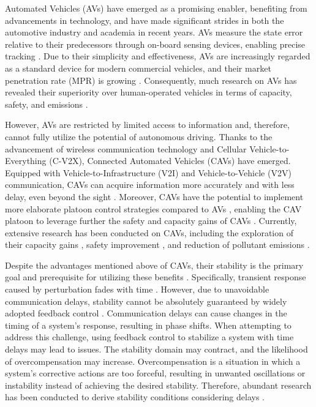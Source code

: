 \documentclass[journal]{IEEEtran}
\begin{document}
Automated Vehicles (AVs) have emerged as a promising enabler, benefiting from advancements in technology, and have made significant strides in both the automotive industry and academia in recent years. AVs measure the state error relative to their predecessors through on-board sensing devices, enabling precise tracking \citep{ulbrich2017towards}. Due to their simplicity and effectiveness, AVs are increasingly regarded as a standard device for modern commercial vehicles, and their market penetration rate (MPR) is growing \citep{Wilson2011, Wilson2008}. Consequently, much research on AVs has revealed their superiority over human-operated vehicles in terms of capacity, safety, and emissions \citep{goni-ros_using_2019, Nikolos2015, kesting_enhanced_2010}.



However, AVs are restricted by limited access to information and, therefore, cannot fully utilize the potential of autonomous driving. Thanks to the advancement of wireless communication technology and Cellular Vehicle-to-Everything (C-V2X), Connected Automated Vehicles (CAVs) have emerged. Equipped with Vehicle-to-Infrastructure (V2I) and Vehicle-to-Vehicle (V2V) communication, CAVs can acquire information more accurately and with less delay, even beyond the sight \citep{Navas2019, Zhou2021}. Moreover, CAVs have the potential to implement more elaborate platoon control strategies compared to AVs \citep{Dey2015, zheng_stability_2015}, enabling the CAV platoon to leverage further the safety and capacity gains of CAVs \citep{Ghiasi2017, li_deployment_2020}. Currently, extensive research has been conducted on CAVs, including the exploration of their capacity gains \citep{sala_capacity_2021, Chang2020}, safety improvement \citep{Zhou2019, Montanino2021, yu2021investigating}, and reduction of pollutant emissions \citep{liu2018impact, xiao2018unravelling}.





Despite the advantages mentioned above of CAVs, their stability is the primary goal and prerequisite for utilizing these benefits \citep{orosz2016connected}. Specifically, transient response caused by perturbation fades with time \citep{doyle2013feedback}. However, due to unavoidable communication delays, stability cannot be absolutely guaranteed by widely adopted feedback control \citep{sipahi2011stability}. Communication delays can cause changes in the timing of a system's response, resulting in phase shifts. When attempting to address this challenge, using feedback control to stabilize a system with time delays may lead to issues. The stability domain may contract, and the likelihood of overcompensation may increase. Overcompensation is a situation in which a system's corrective actions are too forceful, resulting in unwanted oscillations or instability instead of achieving the desired stability. Therefore, abundant research has been conducted to derive stability conditions considering delays \citep{herman1959traffic, zhang1997stability, li2010lyapunov, li2013stability, kamath2015car, sun_stability_2018}.
\end{document}
